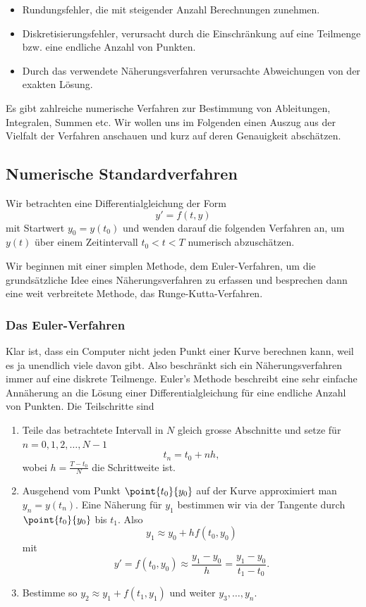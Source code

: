 \documentclass[%
draft,
11pt,%
twoside,%
titlepage,%
german,%
headsepline%
]{scrartcl}
\begin{document}
\begin{itemize}
\item Rundungsfehler, die mit steigender Anzahl Berechnungen zunehmen.
\item Diskretisierungsfehler, verursacht durch die Einschr\"ankung auf eine Teilmenge bzw. eine endliche Anzahl von Punkten.
\item Durch das verwendete N\"aherungsverfahren verursachte Abweichungen von der exakten L\"osung.
\end{itemize}

Es gibt zahlreiche numerische Verfahren zur Bestimmung von Ableitungen, Integralen, Summen etc. Wir wollen uns im Folgenden einen Auszug aus der Vielfalt der Verfahren anschauen und kurz auf deren Genauigkeit absch\"atzen.

\subsection{Numerische Standardverfahren}

Wir betrachten eine Differentialgleichung der Form
$$y'=f(t,y)$$
mit Startwert $y_0=y(t_0)$ und wenden darauf die folgenden Verfahren an, um $y(t)$ \"uber einem Zeitintervall $t_0<t<T$ numerisch abzusch\"atzen.

Wir beginnen mit einer simplen Methode, dem Euler-Verfahren, um die grunds\"atzliche Idee eines N\"aherungsverfahren zu erfassen und besprechen dann eine weit verbreitete Methode, das Runge-Kutta-Verfahren.

\subsubsection{Das Euler-Verfahren}

Klar ist, dass ein Computer nicht jeden Punkt einer Kurve berechnen kann, weil es ja unendlich viele davon gibt. Also beschr\"ankt sich ein N\"aherungsverfahren immer auf eine diskrete Teilmenge. Euler's Methode beschreibt eine sehr einfache Ann\"aherung an die L\"osung einer Differentialgleichung f\"ur eine endliche Anzahl von Punkten. Die Teilschritte sind

\begin{enumerate}
\item Teile das betrachtete Intervall in $N$ gleich grosse Abschnitte und setze f\"ur $n=0,1,2,\dots,N-1$
$$t_n=t_0+nh,$$
wobei $h=\frac{T-t_0}{N}$ die Schrittweite ist.
\item Ausgehend vom Punkt $\point{t_0}{y_0}$ auf der Kurve approximiert man $y_n=y(t_n)$. Eine N\"aherung f\"ur $y_1$ bestimmen wir via der Tangente durch $\point{t_0}{y_0}$ bis $t_1$. Also
$$y_1\approx y_0+hf(t_0,y_0)$$
mit
$$y'=f(t_0,y_0)\approx\frac{y_1-y_0}{h}=\frac{y_1-y_0}{t_1-t_0}.$$
\item Bestimme so $y_2\approx y_1+f(t_1,y_1)$ und weiter $y_3,\dots,y_n$.
\end{enumerate}
\end{document}
